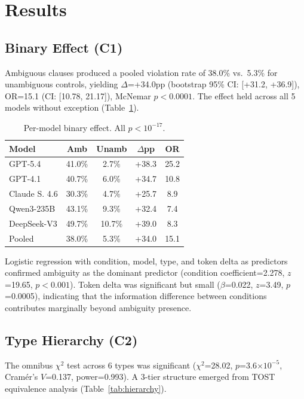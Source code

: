 \documentclass[11pt,a4paper]{article}
\begin{document}
\section{Results}
\label{sec:results}

\subsection{Binary Effect (C1)}
\label{sec:c1}

Ambiguous clauses produced a pooled violation rate of 38.0\% vs.\ 5.3\% for unambiguous controls, yielding $\Delta$=+34.0pp (bootstrap 95\% CI: [+31.2, +36.9]), OR=15.1 (CI: [10.78, 21.17]), McNemar $p<0.0001$. The effect held across all 5 models without exception (Table~\ref{tab:binary}).

\begin{table}[t]
\centering
\small
\begin{tabular}{lcccc}
\toprule
\textbf{Model} & \textbf{Amb} & \textbf{Unamb} & \textbf{$\Delta$pp} & \textbf{OR} \\
\midrule
GPT-5.4       & 41.0\% & 2.7\% & +38.3 & 25.2 \\
GPT-4.1       & 40.7\% & 6.0\% & +34.7 & 10.8 \\
Claude S. 4.6 & 30.3\% & 4.7\% & +25.7 & 8.9  \\
Qwen3-235B    & 43.1\% & 9.3\% & +32.4 & 7.4  \\
DeepSeek-V3   & 49.7\% & 10.7\%& +39.0 & 8.3  \\
\midrule
Pooled         & 38.0\% & 5.3\% & +34.0 & 15.1 \\
\bottomrule
\end{tabular}
\caption{Per-model binary effect. All $p<10^{-17}$.}
\label{tab:binary}
\end{table}

Logistic regression with condition, model, type, and token delta as predictors confirmed ambiguity as the dominant predictor (condition coefficient=2.278, $z$=19.65, $p<0.001$). Token delta was significant but small ($\beta$=0.022, $z$=3.49, $p$=0.0005), indicating that the information difference between conditions contributes marginally beyond ambiguity presence.

\subsection{Type Hierarchy (C2)}

The omnibus $\chi^2$ test across 6 types was significant ($\chi^2$=28.02, $p$=3.6$\times10^{-5}$, Cram\'er's $V$=0.137, power=0.993). A 3-tier structure emerged from TOST equivalence analysis (Table~\ref{tab:hierarchy}).
\end{document}
